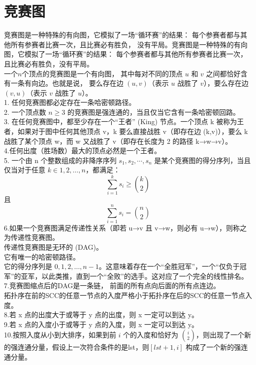 \documentclass[titlepage, a4paper]{report}
\begin{document}
\section{竞赛图}

竞赛图是一种特殊的有向图，它模拟了一场“循环赛”的结果：
每个参赛者都与其他所有参赛者比赛一次，且比赛必有胜负，
没有平局。竞赛图是一种特殊的有向图，它模拟了一场“循环赛”的结果：
每个参赛者都与其他所有参赛者比赛一次，且比赛必有胜负，没有平局。\\
一个$n$个顶点的竞赛图是一个有向图，
其中每对不同的顶点 $u$ 和 $v$ 之间都恰好含有一条有向边。也就是说，
要么存在边 $(u,v)$（表示 $u$ 战胜了 $v$），要么存在边 $(v,u)$（表示 $v$ 战胜了 $u$）。\\
1. 任何竞赛图都必定存在一条哈密顿路径。\\
2. 一个顶点数 $n\ge 3$ 的竞赛图是强连通的，当且仅当它含有一条哈密顿回路。\\
3. 在任何竞赛图中，都至少存在一个“王者” (King) 节点。一个顶点 k 被称为王者，如果对于图中任何其他顶点 v，k 要么直接战胜 v（即存在边 (k,v)），要么 k 战胜了某个顶点 w，而 w 又战胜了 v（即存在长度为 2 的路径 k→w→v）。\\
4.任何出度（胜场数）最大的顶点必然是一个王者。\\
5. 一个由 n 个整数组成的非降序序列 $s_1,s_2,\cdots,s_n$
  是某个竞赛图的得分序列，当且仅当对于任意 $k\in {1,2,…,n}$，都满足：
  $$
  \sum_{i=1}^{k} s_i \ge \binom{k}{2}
  $$
  且
  $$
  \sum_{i=1}^{n} s_i = \binom{n}{2}
  $$
6.如果一个竞赛图满足传递性关系（即若 u→v 且 v→w，则必有 u→w），则称之为传递性竞赛图。 \\ 
传递性竞赛图是无环的 (DAG)。\\
它有唯一的哈密顿路径。\\
它的得分序列是 $0,1,2,…,n−1$。这意味着存在一个“全胜冠军”，一个“仅负于冠军”的亚军，以此类推，直到一个“全败”的选手。这对应了一个完全的线性排名。\\

7.竞赛图缩点后的DAG是一条链， 前面的所有点向后面的所有点连边。\\
拓扑序在前的SCC的任意一节点的入度严格小于拓扑序在后的SCC的任意一节点入度。\\

8.若 x 点的出度大于或等于 y 点的出度，则 x 一定可以到达 y。\\

9.若 x 点的入度小于或等于 y 点的入度，则 x 一定可以到达 y。\\

10.按照入度从小到大排序，如果到前 $i$ 个的入度和恰好为 $\binom{i}{2}$，则出现了一个新的强连通分量，假设上一次符合条件的是lst，则$[lst+1,i]$ 构成了一个新的强连通分量。\\
\end{document}
